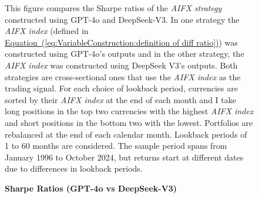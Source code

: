 \documentclass[12pt,oneside,letter]{article}
\newcommand*{\myeq}[1]{\hyperref[{#1}]{Equation~(\ref*{#1})}}
\begin{document}
\begin{landscape}
	
	\begin{figure}

	    \begin{center}
	    	\caption{\bf Sharpe Ratios (GPT-4o vs DeepSeek-V3)}
		    \medskip
		     \label{fig:Performance:GPT-4o vs DeepSeek-V3}
	    \end{center}
	
	
	    \begin{small}
	    This figure compares the Sharpe ratios of the \textit{AIFX strategy} constructed using GPT-4o and DeepSeek-V3. In one strategy the \textit{AIFX index} (defined in \myeq{eq:VariableConstruction:definition of diff ratio}) was constructed using GPT-4o’s outputs and in the other strategy, the \textit{AIFX index} was constructed using DeepSeek V3’s outputs. Both strategies are cross-sectional ones that use the \textit{AIFX index} as the trading signal. For each choice of lookback period, currencies are sorted by their \textit{AIFX index} at the end of each month and I take long positions in the top two currencies with the highest \textit{AIFX index} and short positions in the bottom two with the lowest. Portfolios are rebalanced at the end of each calendar month. Lookback periods of 1 to 60 months are considered. The sample period spans from January 1996 to October 2024, but returns start at different dates due to differences in lookback periods.
	    \end{small}



\end{figure}
\end{landscape}
\end{document}
